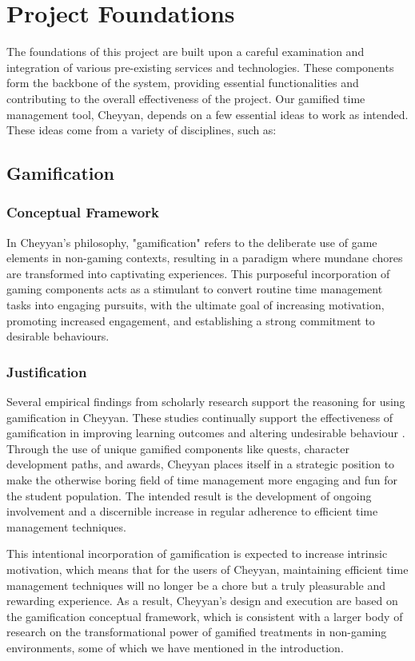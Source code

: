 \documentclass{l4proj}
\begin{document}
\section{Project Foundations}
The foundations of this project are built upon a careful examination and integration of various pre-existing services and technologies. These components form the backbone of the system, providing essential functionalities and contributing to the overall effectiveness of the project.
Our gamified time management tool, Cheyyan, depends on a few essential ideas to work as intended. These ideas come from a variety of disciplines, such as:

\subsection{Gamification}
\subsubsection{Conceptual Framework}
In Cheyyan's philosophy, "gamification" refers to the deliberate use of game elements in non-gaming contexts, resulting in a paradigm where mundane chores are transformed into captivating experiences. This purposeful incorporation of gaming components acts as a stimulant to convert routine time management tasks into engaging pursuits, with the ultimate goal of increasing motivation, promoting increased engagement, and establishing a strong commitment to desirable behaviours. 

\subsubsection{Justification}
Several empirical findings from scholarly research support the reasoning for using gamification in Cheyyan. These studies continually support the effectiveness of gamification in improving learning outcomes and altering undesirable behaviour \cite{hamari2014does}. Through the use of unique gamified components like quests, character development paths, and awards, Cheyyan places itself in a strategic position to make the otherwise boring field of time management more engaging and fun for the student population. The intended result is the development of ongoing involvement and a discernible increase in regular adherence to efficient time management techniques.

This intentional incorporation of gamification is expected to increase intrinsic motivation, which means that for the users of Cheyyan, maintaining efficient time management techniques will no longer be a chore but a truly pleasurable and rewarding experience. As a result, Cheyyan's design and execution are based on the gamification conceptual framework, which is consistent with a larger body of research on the transformational power of gamified treatments in non-gaming environments, some of which we have mentioned in the introduction.
\end{document}
